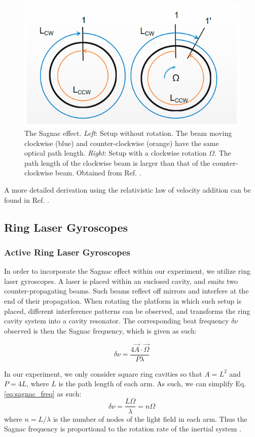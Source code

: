 \documentclass[a4paper]{report}
\numberwithin{equation}{section}
\begin{document}
\begin{figure}[h!]
	\centering
	\includegraphics[width=0.6\columnwidth]{sagnac_effect.jpg}
	\caption{The Sagnac effect. \textit{Left}: Setup without rotation. The beam moving clockwise (blue) and counter-clockwise (orange)
	have the same optical path length. \textit{Right}: Setup with a clockwise rotation $\Omega$. The path length of the 
	clockwise beam is larger than that of the counter-clockwise beam. Obtained from Ref. \cite{Feng2020}.}
	\label{fig:sagnac_effect}
\end{figure}

A more detailed derivation using the relativistic law of velocity addition can be found in Ref. \cite{Benedetto2019}. 

\subsection{Ring Laser Gyroscopes}

\subsubsection{Active Ring Laser Gyroscopes}

In order to incorporate the Sagnac effect within our experiment, we utilize ring laser gyroscopes. A laser is placed within an 
enclosed cavity, and emits two counter-propagating beams. Such beams reflect off mirrors and interfere at the end of their 
propagation. When rotating the platform in which such setup is placed, different interference patterns can be observed, and 
transforms the ring cavity system into a cavity resonator. The corresponding beat frequency $\delta \nu$ observed is then the 
Sagnac frequency, which is given as such:

\begin{equation}
	\delta \nu = \frac{4 \vec{A} \cdot \vec{\Omega}}{P \lambda}
	\label{eq:sagnac_freq}
\end{equation}

In our experiment, we only consider square ring cavities so that $A = L^2$ and $P = 4L$, where $L$ is the path length of each arm. 
As such, we can simplify Eq. \ref{eq:sagnac_freq} as such: 
\begin{equation}
	\delta \nu  = \frac{L \Omega}{\lambda} = n \Omega
\end{equation}
where $n = L / \lambda$ is the number of nodes of the light field in each arm. Thus the Sagnac frequency is proportional to the rotation rate
of the inertial system \cite{Groh2021}.\par 
\end{document}
